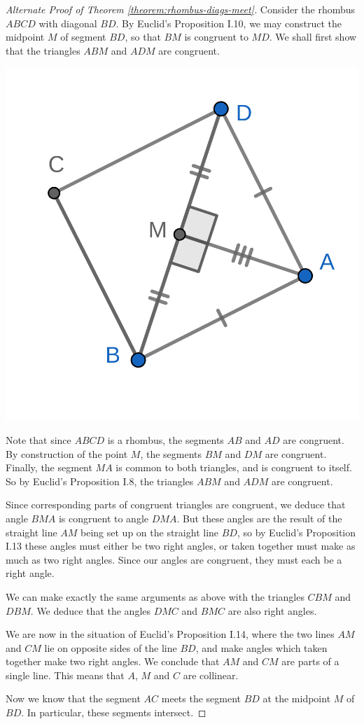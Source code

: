 \documentclass{tufte-handout}
\theoremstyle{definition}
\begin{document}
\begin{proof}[Alternate Proof of Theorem \ref{theorem:rhombus-diags-meet}]
Consider the rhombus $ABCD$ with diagonal $BD$. By Euclid's Proposition I.10, we may construct the midpoint $M$ of segment $BD$, so that $BM$ is congruent to $MD$. We shall first show that the triangles $ABM$ and $ADM$ are congruent.

\begin{marginfigure}
  \includegraphics{images/rhombus_midpt_diag_pf.png}
\end{marginfigure}

Note that since $ABCD$ is a rhombus, the segments $AB$ and $AD$ are congruent. By construction of the point $M$, the segments $BM$ and $DM$ are congruent. Finally, the segment $MA$ is common to both triangles, and is congruent to itself. So by Euclid's Proposition I.8, the triangles $ABM$ and $ADM$ are congruent.

Since corresponding parts of congruent triangles are congruent, we deduce that angle $BMA$ is congruent to angle $DMA$. But these angles are the result of the straight line $AM$ being set up on the straight line $BD$, so by Euclid's Proposition I.13 these angles must either be two right angles, or taken together must make as much as two right angles. Since our angles are congruent, they must each be a right angle.

We can make exactly the same arguments as above with the triangles $CBM$ and $DBM$. We deduce that the angles $DMC$ and $BMC$ are also right angles.

We are now in the situation of Euclid's Proposition I.14, where the two lines $AM$ and $CM$ lie on opposite sides of the line $BD$, and make angles which taken together make two right angles. We conclude that $AM$ and $CM$ are parts of a single line. This means that $A$, $M$ and $C$ are collinear.

Now we know that the segment $AC$ meets the segment $BD$ at the midpoint $M$ of $BD$. In particular, these segments intersect.
\end{proof}
\end{document}
